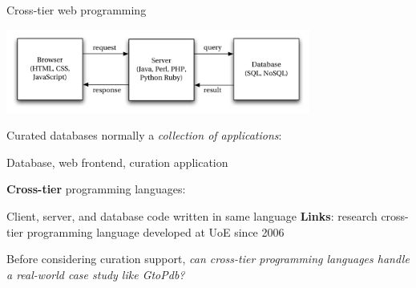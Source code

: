 \documentclass[11.5pt, aspectratio=169]{beamer}
\begin{document}
\begin{frame}{Cross-tier web programming}

  \begin{center}
    \includegraphics[width=0.75\textwidth]{images/3tier.pdf}
  \end{center}

  \begin{fullpageitemize}
  \item Curated databases normally a
    \emph{collection of applications}:
    \begin{itemize}
      \itemR Database, web frontend, curation application
    \end{itemize}
    \vspace{1em}
  \item \textbf{Cross-tier} programming languages:
    \begin{itemize}
      \itemR Client, server, and database code written in same language
      \itemR \textbf{Links}: research cross-tier programming language developed
        at UoE since 2006
    \end{itemize}
    \vspace{1em}
  \item Before considering curation support, \emph{can cross-tier programming
    languages handle a real-world case study like GtoPdb?}
  \end{fullpageitemize}
\end{frame}


\end{document}
